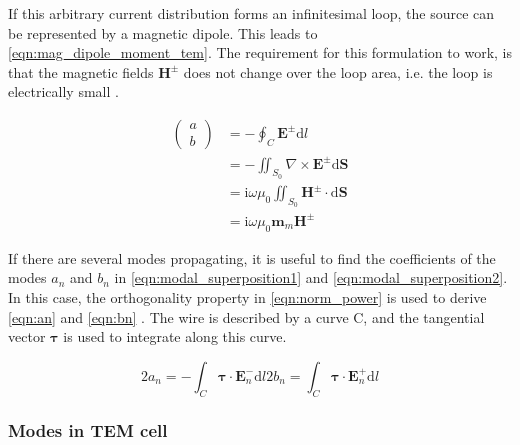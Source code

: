 If this arbitrary current distribution forms an infinitesimal loop, the source can be represented by a magnetic dipole. This leads to \autoref{eqn:mag_dipole_moment_tem}. The requirement for this formulation to work, is that the magnetic fields $\mathbf{H}^\pm$ does not change over the loop area, i.e. the loop is electrically small \cite{Collin_2015,Sreenivasiah_Chang_Ma_1981}.

\begin{align}
    \begin{pmatrix}a \\b\end{pmatrix} &= -\oint_C \mathbf{E}^\pm \mathrm{d}l \\
    &= -\iint_{S_0} \nabla \times \mathbf{E}^\pm \mathrm{d}\mathbf{S}\\
    &= \mathrm{i}\omega\mu_0\iint_{S_0} \mathbf{H}^\pm\cdot \mathrm{d}\mathbf{S}\\
    &= \mathrm{i}\omega\mu_0\mathbf{m}_m\mathbf{H}^\pm 
    \label{eqn:mag_dipole_moment_tem}
\end{align}


If there are several modes propagating, it is useful to find the coefficients of the modes $a_n$ and $b_n$ in \autoref{eqn:modal_superposition1} and \autoref{eqn:modal_superposition2}. In this case, the orthogonality property in \autoref{eqn:norm_power} is used to derive \autoref{eqn:an} and \autoref{eqn:bn} \cite{Collin_2015}. The wire is described by a curve C, and the tangential vector $\boldsymbol{\tau}$ is used to integrate along this curve.

\begin{subequations}
    \begin{equation}
        2a_n = -\int_C \boldsymbol{\tau}\cdot\mathbf{E}_n^-\mathrm{d}l
        \label{eqn:an}
    \end{equation}
        \begin{equation}
        2b_n = \int_C \boldsymbol{\tau}\cdot\mathbf{E}_n^+\mathrm{d}l
        \label{eqn:bn}
    \end{equation}
\end{subequations}

\subsubsection{Modes in TEM cell}

